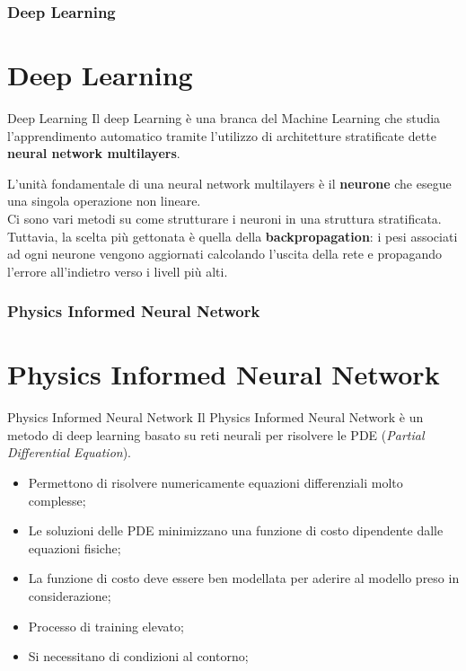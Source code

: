 \documentclass{beamer}
\begin{document}
\begin{frame}
	\frametitle{Deep Learning}
	\section{Deep Learning}
	\begin{block}{Deep Learning}
		Il deep Learning è una branca del Machine Learning che studia l'apprendimento automatico tramite l'utilizzo di architetture stratificate dette \textbf{neural  network multilayers}.
	\end{block}
	L'unità fondamentale di una neural network multilayers è il \textbf{neurone} che esegue una singola operazione non lineare.\\
Ci sono vari metodi su come strutturare i neuroni in una struttura stratificata. Tuttavia, la scelta più gettonata è quella della \textbf{backpropagation}: i pesi associati ad ogni neurone vengono aggiornati calcolando l'uscita della rete e propagando l'errore all'indietro verso i livell più alti.
\end{frame}
\begin{frame}
	\frametitle{Physics Informed Neural Network}
	\section{Physics Informed Neural Network}
	\begin{block}{Physics Informed Neural Network}
		Il Physics Informed Neural Network è un metodo di deep learning basato su reti neurali per risolvere le PDE (\emph{Partial Differential Equation}).
	\end{block}
	\begin{itemize}
		\item Permettono di risolvere numericamente equazioni differenziali molto complesse;
		\item Le soluzioni delle PDE minimizzano una funzione di costo dipendente dalle equazioni fisiche;
		\item La funzione di costo deve essere ben modellata per aderire al modello preso in considerazione;
		\item Processo di training elevato;
		\item Si necessitano di condizioni al contorno;
	\end{itemize}
\end{frame}
\end{document}
